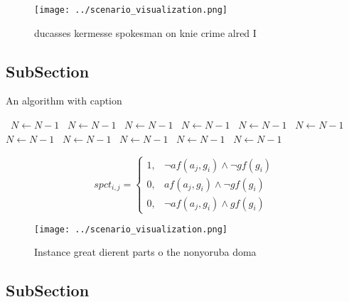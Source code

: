 \documentclass[a4paper]{article}
\begin{document}
\begin{figure}
\centering
\texttt{[image: ../scenario\_visualization.png]}
\caption{ducasses kermesse spokesman on knie crime alred I
}
\end{figure}
 
\subsection{SubSection}

\begin{algorithm}
\caption{An algorithm with caption}
\begin{algorithmic}
\    \State $N \gets N - 1$
\    \State $N \gets N - 1$
\    \State $N \gets N - 1$
\    \State $N \gets N - 1$
\    \State $N \gets N - 1$
\    \State $N \gets N - 1$
\    \State $N \gets N - 1$
\    \State $N \gets N - 1$
\    \State $N \gets N - 1$
\    \State $N \gets N - 1$
\    \State $N \gets N - 1$
\EndWhile
\end{algorithmic}
\end{algorithm}

\begin{equation}
spct_{i,j} =
\begin{cases}
1, & \text{$\neg af(a_j,g_i) \wedge \neg gf(g_i)$}\\
0, & \text{$af(a_j,g_i) \wedge \neg gf(g_i)$}\\
0, & \text{$\neg af(a_j,g_i) \wedge gf(g_i)$}
\end{cases}
\end{equation}

\begin{figure}
\centering
\texttt{[image: ../scenario\_visualization.png]}
\caption{Instance great dierent parts o the nonyoruba doma
}
\end{figure}
 
\subsection{SubSection}
\end{document}
